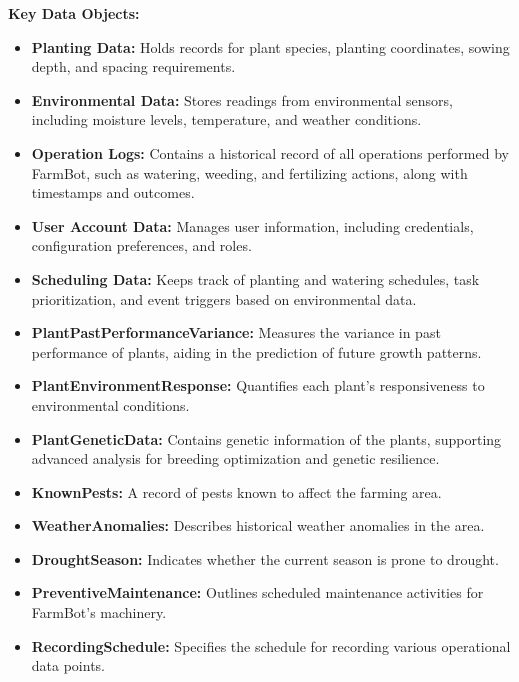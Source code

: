 \textbf{Key Data Objects:}
\begin{itemize}
    \item \textbf{Planting Data:} Holds records for plant species, planting coordinates, sowing depth, and spacing requirements.
    \item \textbf{Environmental Data:} Stores readings from environmental sensors, including moisture levels, temperature, and weather conditions.
    \item \textbf{Operation Logs:} Contains a historical record of all operations performed by FarmBot, such as watering, weeding, and fertilizing actions, along with timestamps and outcomes.
    \item \textbf{User Account Data:} Manages user information, including credentials, configuration preferences, and roles.
    \item \textbf{Scheduling Data:} Keeps track of planting and watering schedules, task prioritization, and event triggers based on environmental data.
    \item \textbf{PlantPastPerformanceVariance:} Measures the variance in past performance of plants, aiding in the prediction of future growth patterns.
    \item \textbf{PlantEnvironmentResponse:} Quantifies each plant's responsiveness to environmental conditions.
    \item \textbf{PlantGeneticData:} Contains genetic information of the plants, supporting advanced analysis for breeding optimization and genetic resilience.
    \item \textbf{KnownPests:} A record of pests known to affect the farming area.
    \item \textbf{WeatherAnomalies:} Describes historical weather anomalies in the area.
    \item \textbf{DroughtSeason:} Indicates whether the current season is prone to drought.
    \item \textbf{PreventiveMaintenance:} Outlines scheduled maintenance activities for FarmBot's machinery.
    \item \textbf{RecordingSchedule:} Specifies the schedule for recording various operational data points.
\end{itemize}

